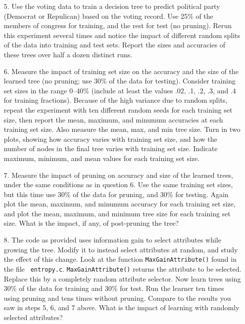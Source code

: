 \begin{itemize}
\item [5.] Use the voting data to train a decision tree to predict
political party (Democrat or Repulican) based on the voting record.  Use 25\%
of the members of congress for training, and the rest for test (no pruning).
Rerun this experiment several times and notice the impact of different random
splits of the data into training and test sets.  Report the sizes and
accuracies of these trees over half a dozen distinct runs.

\item [6.] Measure the impact of training set size on the accuracy and the size
of the learned tree (no pruning; use 30\% of the data for testing).  Consider
training set sizes in the range 0--40\% (include at least the values .02, .1,
.2, .3, and .4 for training fractions). Because of the high variance due to
random splits, repeat the experiment with ten different random seeds for each
training set size, then report the mean, maximum, and minumum accuracies at
each training set size.  Also measure the mean, max, and min tree size.  Turn
in two plots, showing how accuracy varies with training set size, and how the
number of nodes in the final tree varies with training set size.  Indicate
maximum, minimum, and mean values for each training set size.

\item [7.] Measure the impact of pruning on accuracy and size of the learned
trees, under the same conditions as in question 6.  Use the same training set
sizes, but this time use 30\% of the data for pruning, and 30\% for testing.
Again plot the mean, maximum, and minumum accuracy for each training set size,
and plot the mean, maximum, and minimum tree size for each training set size.
What is the impact, if any, of post-pruning the tree?


\item [8.] The code as provided uses information gain to select attributes 
while growing the tree.  Modify it
to instead select attributes at random, and study the effect of this
change. Look at the function {\tt MaxGainAttribute()} found in the file {\tt
entropy.c}.  {\tt MaxGainAttribute()} returns the attribute to be selected.
Replace this by a completely random attribute selector.  Now learn trees using
30\% of the data for training and 30\% for test.  Run the learner ten times
using pruning and tens times without pruning.  Compare to the results you saw
in steps 5, 6, and 7 above.  What is the impact of learning with randomly
selected attributes?

\end{itemize}


